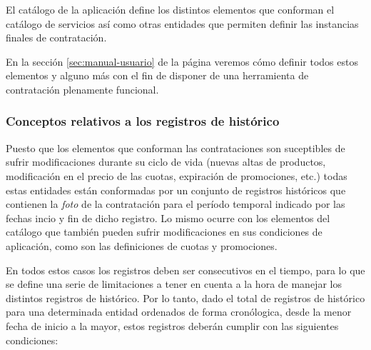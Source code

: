 El catálogo de la aplicación define los distintos elementos que conforman el catálogo de servicios así como otras entidades que permiten definir las instancias finales de contratación.



En la sección \ref{sec:manual-usuario} de la página \pageref{sec:manual-usuario} veremos cómo definir todos estos elementos y alguno más con el fin de disponer de una herramienta de contratación plenamente funcional.



\subsubsection{Conceptos relativos a los registros de histórico}
\label{sub:histórico-conceptos}

Puesto que los elementos que conforman las contrataciones son suceptibles de sufrir modificaciones durante su ciclo de vida (nuevas altas de productos, modificación en el precio de las cuotas, expiración de promociones, etc.) todas estas entidades están conformadas por un conjunto de registros históricos que contienen la \textit{foto} de la contratación para el período temporal indicado por las fechas incio y fin de dicho registro. Lo mismo ocurre con los elementos del catálogo que también pueden sufrir modificaciones en sus condiciones de aplicación, como son las definiciones de cuotas y promociones.

En todos estos casos los registros deben ser consecutivos en el tiempo, para lo que se define una serie de limitaciones a tener en cuenta a la hora de manejar los distintos registros de histórico. Por lo tanto, dado el total de registros de histórico para una determinada entidad ordenados de forma cronólogica, desde la menor fecha de inicio a la mayor, estos registros deberán cumplir con las siguientes condiciones:


